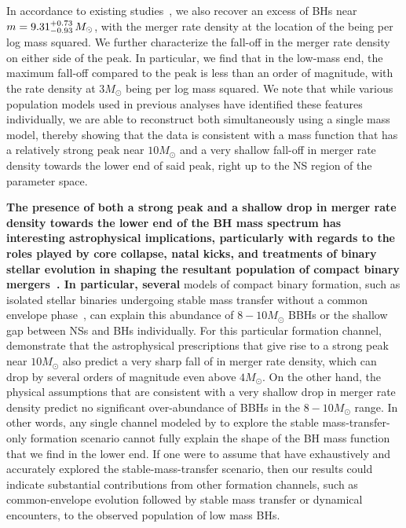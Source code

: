 \documentclass[modern]{aastex631}
\begin{document}
In accordance to existing studies~\citep[e.g.,][]{KAGRA:2021duu, LIGOScientific:2024elc, Tiwari:2021yvr, Farah:2023vsc, Ray:2023upk, Sadiq:2023zee, Edelman:2022ydv, Callister:2023tgi, Ray:2023upk, Ray:2024hos, Heinzel:2024hva}, we also recover an excess
of BHs near $m=9.31^{+0.73}_{-0.93} \, M_\odot$, with the merger rate density at the location of the being \dNlogmpeakincludingnewunits per log mass squared. We further characterize the fall-off in the merger rate density on either side of the peak. In particular, we find that in the low-mass end, the maximum fall-off compared to the peak is less than an order of magnitude, with the rate density at $3M_{\odot}$ being \dNlogmmlowincludingnewunits per log mass squared. We note that while various population models used in previous analyses have identified these features individually,  we are able to reconstruct both simultaneously using a single mass model, thereby showing that the data is consistent with a mass function that has a relatively strong peak near $10M_{\odot}$ and a very shallow fall-off in merger rate density towards the lower end of said peak, right up to the NS region of the parameter space.

\textbf{The presence of both a strong peak and a shallow drop in merger rate density towards the lower end of the BH mass spectrum has interesting astrophysical implications, particularly with regards to the roles played by core collapse, natal kicks, and treatments of binary stellar evolution in shaping the resultant population of compact binary mergers~\citep{Belczynski:2017gds, Giacobbo:2018etu,Schneider:2020vvh, vanSon:2022myr}. In particular, several} models of compact binary formation, such as isolated stellar binaries undergoing stable
mass transfer without a common envelope phase~\citep{vanSon:2022myr}, can explain this abundance of $8-10M_{\odot}$ BBHs or the shallow gap between NSs and BHs individually. For this particular formation channel, \cite{vanSon:2022myr} demonstrate that the astrophysical prescriptions that give rise to a strong peak near $10M_{\odot}$ also predict a very sharp fall of in merger rate density, which can drop by several orders of magnitude even above $4M_{\odot}$. On the other hand, the physical assumptions that are consistent with a very shallow drop in merger rate density predict no significant over-abundance of BBHs in the $8-10M_{\odot}$ range. In other words, any single channel modeled by  \cite{vanSon:2022myr} to explore the stable mass-transfer-only formation scenario cannot fully explain the shape of the BH mass function that we find in the lower end. If one were to assume that \cite{vanSon:2022myr} have exhaustively and accurately explored the stable-mass-transfer scenario, then our results could indicate substantial contributions from other formation channels, such as common-envelope evolution followed by stable mass transfer or dynamical encounters, to the observed population of low mass BHs.
\end{document}
